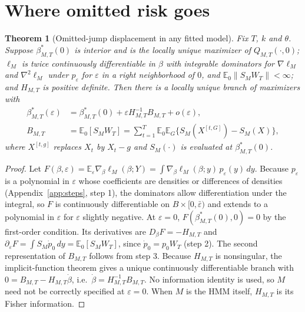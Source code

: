 \documentclass[11pt,a4paper]{article}
\newtheorem{theorem}{Theorem}
\theoremstyle{definition}
\theoremstyle{remark}
\newcommand{\E}{\mathbb{E}}
\begin{document}
\section{Where omitted risk goes}\label{sec:where}
\begin{theorem}[Omitted-jump displacement in any fitted model]\label{thm:displacement}
Fix $T$, $k$ and $\theta$. Suppose $\beta^*_{M,T}(0)$ is interior and is the locally unique maximizer of $Q_{M,T}(\cdot,0)$; $\ell_M$ is twice continuously differentiable in $\beta$ with integrable dominators for $\nabla\ell_M$ and $\nabla^2\ell_M$ under $p_\varepsilon$ for $\varepsilon$ in a right neighborhood of $0$, and $\E_0\|S_MW_T\|<\infty$; and $H_{M,T}$ is positive definite. Then there is a locally unique branch of maximizers with
\begin{equation}\label{eq:displacement}
\begin{aligned}
\beta^*_{M,T}(\varepsilon)&=\beta^*_{M,T}(0)+\varepsilon H_{M,T}^{-1}B_{M,T}+o(\varepsilon),\\
B_{M,T}&=\E_0[S_MW_T]=\sum_{t=1}^T\E_0\E_G\big\{S_M(X^{[t,G]})-S_M(X)\big\},
\end{aligned}
\end{equation}
where $X^{[t,g]}$ replaces $X_t$ by $X_t-g$ and $S_M(\cdot)$ is evaluated at $\beta^*_{M,T}(0)$.
\end{theorem}
\begin{proof}
Let $F(\beta,\varepsilon)=\E_\varepsilon\nabla_\beta\ell_M(\beta;Y)=\int\nabla_\beta\ell_M(\beta;y)\,p_\varepsilon(y)\,dy$. Because $p_\varepsilon$ is a polynomial in $\varepsilon$ whose coefficients are densities or differences of densities (Appendix~\ref{app:steps}, step 1), the dominators allow differentiation under the integral, so $F$ is continuously differentiable on $B\times[0,\bar\varepsilon)$ and extends to a polynomial in $\varepsilon$ for $\varepsilon$ slightly negative. At $\varepsilon=0$, $F(\beta^*_{M,T}(0),0)=0$ by the first-order condition. Its derivatives are $D_\beta F=-H_{M,T}$ and $\partial_\varepsilon F=\int S_M\dot p_0\,dy=\E_0[S_MW_T]$, since $\dot p_0=p_0W_T$ (step 2). The second representation of $B_{M,T}$ follows from step 3. Because $H_{M,T}$ is nonsingular, the implicit-function theorem gives a unique continuously differentiable branch with $0=B_{M,T}-H_{M,T}\dot\beta$, i.e.\ $\dot\beta=H_{M,T}^{-1}B_{M,T}$. No information identity is used, so $M$ need not be correctly specified at $\varepsilon=0$. When $M$ is the HMM itself, $H_{M,T}$ is its Fisher information.
\end{proof}
\end{document}
